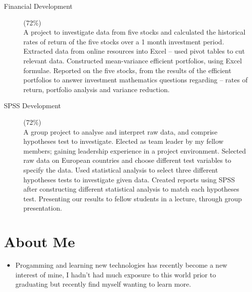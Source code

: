 \documentclass[a4paper,10pt]{extarticle} %
\begin{document}
{\begin{description}
\item[Financial Development] (72\%) \hfill \\
A project to investigate data from five stocks and calculated the historical rates of return of the five stocks over a 1 month investment period. Extracted data from online resources into Excel – used pivot tables to cut relevant data. Constructed mean-variance efficient portfolios, using Excel formulae. Reported on the five stocks, from the results of the efficient portfolios to answer investment mathematics questions regarding – rates of return, portfolio analysis and variance reduction.

\item[SPSS Development] (72\%) \hfill \\
A group project to analyse and interpret raw data, and comprise hypotheses test to investigate. Elected as team leader by my fellow members; gaining leadership experience in a project environment. Selected raw data on European countries and choose different test variables to specify the data. Used statistical analysis to select three different hypotheses tests to investigate given data. Created reports using SPSS after constructing different statistical analysis to match each hypotheses test. Presenting our results to fellow students in a lecture, through group presentation.


\end{description}


\section{\textcolor{primary}{About Me}}

\begin{itemize}
\vspace{0.2cm}
\item Progamming and learning new technologies has recently become a new interest of mine, I hadn't had much exposure to this world prior to graduating but recently find myself wanting to learn more.


\end{itemize}}
\end{document}
